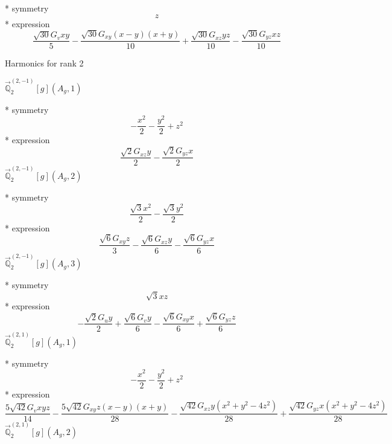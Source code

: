 \documentclass[fleqn,8pt]{jsarticle}
\begin{document}
\noindent\quad ** symmetry
\begin{dmath*}
z
\end{dmath*}
\noindent\quad ** expression
\begin{dmath*}
\frac{\sqrt{30} G_{v} x y}{5} - \frac{\sqrt{30} G_{xy} \left(x - y\right) \left(x + y\right)}{10} + \frac{\sqrt{30} G_{xz} y z}{10} - \frac{\sqrt{30} G_{yz} x z}{10}
\end{dmath*}

\noindent * Harmonics for rank 2

\noindent\quad $\vec{\mathbb{Q}}_{2}^{(2,-1)}[g](A_{g},1)$

\noindent\quad ** symmetry
\begin{dmath*}
- \frac{x^{2}}{2} - \frac{y^{2}}{2} + z^{2}
\end{dmath*}
\noindent\quad ** expression
\begin{dmath*}
\frac{\sqrt{2} G_{xz} y}{2} - \frac{\sqrt{2} G_{yz} x}{2}
\end{dmath*}
\noindent\quad $\vec{\mathbb{Q}}_{2}^{(2,-1)}[g](A_{g},2)$

\noindent\quad ** symmetry
\begin{dmath*}
\frac{\sqrt{3} x^{2}}{2} - \frac{\sqrt{3} y^{2}}{2}
\end{dmath*}
\noindent\quad ** expression
\begin{dmath*}
\frac{\sqrt{6} G_{xy} z}{3} - \frac{\sqrt{6} G_{xz} y}{6} - \frac{\sqrt{6} G_{yz} x}{6}
\end{dmath*}
\noindent\quad $\vec{\mathbb{Q}}_{2}^{(2,-1)}[g](A_{g},3)$

\noindent\quad ** symmetry
\begin{dmath*}
\sqrt{3} x z
\end{dmath*}
\noindent\quad ** expression
\begin{dmath*}
- \frac{\sqrt{2} G_{u} y}{2} + \frac{\sqrt{6} G_{v} y}{6} - \frac{\sqrt{6} G_{xy} x}{6} + \frac{\sqrt{6} G_{yz} z}{6}
\end{dmath*}
\noindent\quad $\vec{\mathbb{Q}}_{2}^{(2,1)}[g](A_{g},1)$

\noindent\quad ** symmetry
\begin{dmath*}
- \frac{x^{2}}{2} - \frac{y^{2}}{2} + z^{2}
\end{dmath*}
\noindent\quad ** expression
\begin{dmath*}
\frac{5 \sqrt{42} G_{v} x y z}{14} - \frac{5 \sqrt{42} G_{xy} z \left(x - y\right) \left(x + y\right)}{28} - \frac{\sqrt{42} G_{xz} y \left(x^{2} + y^{2} - 4 z^{2}\right)}{28} + \frac{\sqrt{42} G_{yz} x \left(x^{2} + y^{2} - 4 z^{2}\right)}{28}
\end{dmath*}
\noindent\quad $\vec{\mathbb{Q}}_{2}^{(2,1)}[g](A_{g},2)$
\end{document}
